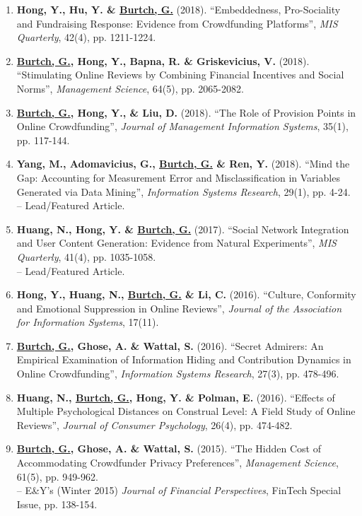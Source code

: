 \documentclass[10.5pt,letterpaper,sans]{moderncv}        %
\begin{document}
\begin{enumerate}[leftmargin=!,labelindent=5pt,itemindent=-15pt]
\item \textbf{Hong, Y., Hu, Y. \& \underline{Burtch, G.}} (2018). ``Embeddedness, Pro-Sociality and Fundraising Response: Evidence from Crowdfunding Platforms'', \textit{MIS Quarterly}, 42(4), pp. 1211-1224.

\item \textbf{\underline{Burtch, G.}, Hong, Y., Bapna, R. \& Griskevicius, V.} (2018). ``Stimulating Online Reviews by Combining Financial Incentives and Social Norms'', \textit{Management Science}, 64(5), pp. 2065-2082.

\item \textbf{\underline{Burtch, G.}, Hong, Y., \& Liu, D.} (2018). ``The Role of Provision Points in Online Crowdfunding'', \textit{Journal of Management Information Systems}, 35(1), pp. 117-144.

\item \textbf{Yang, M., Adomavicius, G., \underline{Burtch, G.} \& Ren, Y.} (2018). ``Mind the Gap: Accounting for Measurement Error and Misclassification in Variables Generated via Data Mining'', \textit{Information Systems Research}, 29(1), pp. 4-24. \\-- Lead/Featured Article.

\item \textbf{Huang, N., Hong, Y. \& \underline{Burtch, G.}} (2017). ``Social Network Integration and User Content Generation: Evidence from Natural Experiments'', \textit{MIS Quarterly}, 41(4), pp. 1035-1058. \\-- Lead/Featured Article.

\item \textbf{Hong, Y., Huang, N., \underline{Burtch, G.} \& Li, C.} (2016). ``Culture, Conformity and Emotional Suppression in Online Reviews'', \textit{Journal of the Association for Information Systems}, 17(11).

\item \textbf{\underline{Burtch, G.}, Ghose, A. \& Wattal, S.} (2016). ``Secret Admirers: An Empirical Examination of Information Hiding and Contribution Dynamics in Online Crowdfunding'', \textit{Information Systems Research}, 27(3), pp. 478-496.

\item \textbf{Huang, N., \underline{Burtch, G.}, Hong, Y. \& Polman, E.} (2016). ``Effects of Multiple Psychological Distances on Construal Level: A Field Study of Online Reviews'', \textit{Journal of Consumer Psychology}, 26(4), pp. 474-482.

\item \textbf{\underline{Burtch, G.}, Ghose, A. \& Wattal, S.} (2015). ``The Hidden Cost of Accommodating Crowdfunder Privacy Preferences'', \textit{Management Science}, 61(5), pp. 949-962. \\-- E\&Y's (Winter 2015) \textit{Journal of Financial Perspectives}, FinTech Special Issue, pp. 138-154.


\end{enumerate}
\end{document}
